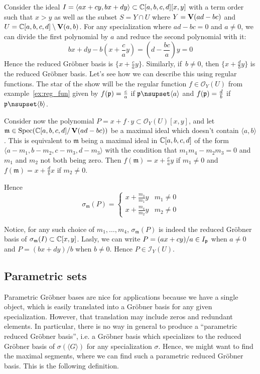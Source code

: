 \begin{example}\upshape
  Consider the ideal $I = \langle ax + cy, bx + dy \rangle \subset \mathbb{C}[a, b, c, d][x, y]$ with a term order such that $x > y$ as well as the subset $S = Y \cap U$ where $Y = \operatorname{\mathbf V}(ad - bc)$ and $U = \mathbb{C}[a, b, c, d] \setminus \operatorname{\mathbf V}(a, b)$. For any specialization where $ad - bc = 0$ and $a \neq 0$, we can divide the first polynomial by $a$ and reduce the second polynomial with it:
  \[bx + dy - b\left(x + \frac c a y\right) = \left(d - \frac{bc}{a}\right)y = 0\]
  Hence the reduced Gröbner basis is $\{x + \frac c a y\}$. Similarly, if $\,b \neq 0$, then $\{x + \frac d b y\}$ is the reduced Gröbner basis. Let's see how we can describe this using regular functions. The star of the show will be the regular function $f \in \mathcal O_{Y}(U)$ from example~\ref{ex:reg_fun} given by $f(\mathfrak p) = \frac c a$ if $\p \nsupset \langle a \rangle$ and $f(\mathfrak p) = \frac d b$ if $\p \nsupset \langle b \rangle$.

  Consider now the polynomial $P = x + f \cdot y \subset \mathcal O_{Y}(U)[x, y]$, and let $\mathfrak m \in \operatorname{Spec}(\mathbb{C}[a, b, c, d]/\operatorname{\mathbf V}(ad - bc))$ be a maximal ideal which doesn't contain $\langle a, b \rangle$. This is equivalent to $\mathfrak m$ being a maximal ideal in $\mathbb{C}[a, b, c, d]$ of the form $\langle a - m_{1}, b - m_{2}, c - m_{3}, d - m_{3} \rangle$ with the condition that $m_{1} m_{4} - m_{2} m_{3} = 0$ and $m_{1}$ and $m_{2}$ not both being zero. Then $f(\mathfrak m) = x + \frac c a y$ if $m_{1} \neq 0$ and $f(\mathfrak m) = x + \frac d b x$ if $m_{2} \neq 0$.

  Hence \[\sigma_{\mathfrak m}(P) =
    \begin{cases}
      x + \frac{m_{3}}{m_{1}}y & m_{1} \neq 0 \\
      x + \frac{m_{4}}{m_{2}}y & m_{2} \neq 0
    \end{cases}
  \]

  Notice, for any such choice of $m_{1}, \dots, m_{4}$, $\sigma_{\mathfrak m}(P)$ is indeed the reduced Gröbner basis of $\sigma_{\mathfrak m}(I) \subset \mathbb{C}[x, y]$. Lasly, we can write $P = (ax + cy)/a \in I_{\mathfrak p}$ when $a \neq 0$ and $P = (bx + dy)/b$ when $b \neq 0$. Hence $P \in \mathcal I_{Y}(U)$.
\end{example}

\subsection{Parametric sets}
Parametric Gröbner bases are nice for applications because we have a single object, which is easily translated into a Gröbner basis for any given specialization. However, that translation may include zeros and redundant elements. In particular, there is no way in general to produce a ``parametric reduced Gröbner basis'', i.e. a Gröbner basis which specializes to the reduced Gröbner basis of $\sigma(\langle G \rangle)$ for any specialization $\sigma$. Hence, we might want to find the maximal segments, where we can find such a parametric reduced Gröbner basis. This is the following definition.

